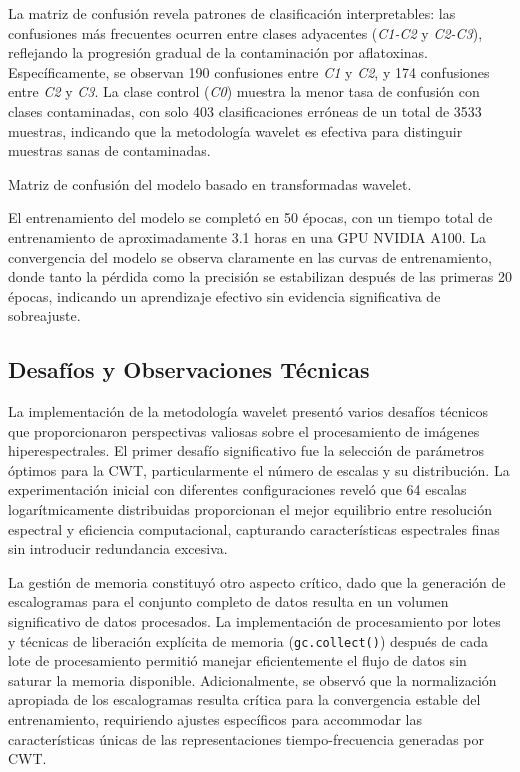 \vspace{5mm}

La matriz de confusión revela patrones de clasificación interpretables: las confusiones más frecuentes ocurren entre clases adyacentes (\emph{C1-C2} y \emph{C2-C3}), reflejando la progresión gradual de la contaminación por aflatoxinas. Específicamente, se observan 190 confusiones entre \emph{C1} y \emph{C2}, y 174 confusiones entre \emph{C2} y \emph{C3}. La clase control (\emph{C0}) muestra la menor tasa de confusión con clases contaminadas, con solo 403 clasificaciones erróneas de un total de 3533 muestras, indicando que la metodología wavelet es efectiva para distinguir muestras sanas de contaminadas.

\begin{table}[ht]
\centering
\caption{Matriz de confusión del modelo basado en transformadas wavelet.}
\label{tab:wavelet_confusion_matrix}
\end{table}

\vspace{5mm}

El entrenamiento del modelo se completó en 50 épocas, con un tiempo total de entrenamiento de aproximadamente 3.1 horas en una GPU NVIDIA A100. La convergencia del modelo se observa claramente en las curvas de entrenamiento, donde tanto la pérdida como la precisión se estabilizan después de las primeras 20 épocas, indicando un aprendizaje efectivo sin evidencia significativa de sobreajuste.

\subsection{Desafíos y Observaciones Técnicas}

La implementación de la metodología wavelet presentó varios desafíos técnicos que proporcionaron perspectivas valiosas sobre el procesamiento de imágenes hiperespectrales. El primer desafío significativo fue la selección de parámetros óptimos para la CWT, particularmente el número de escalas y su distribución. La experimentación inicial con diferentes configuraciones reveló que 64 escalas logarítmicamente distribuidas proporcionan el mejor equilibrio entre resolución espectral y eficiencia computacional, capturando características espectrales finas sin introducir redundancia excesiva.

\vspace{5mm}

La gestión de memoria constituyó otro aspecto crítico, dado que la generación de escalogramas para el conjunto completo de datos resulta en un volumen significativo de datos procesados. La implementación de procesamiento por lotes y técnicas de liberación explícita de memoria (\texttt{gc.collect()}) después de cada lote de procesamiento permitió manejar eficientemente el flujo de datos sin saturar la memoria disponible. Adicionalmente, se observó que la normalización apropiada de los escalogramas resulta crítica para la convergencia estable del entrenamiento, requiriendo ajustes específicos para accommodar las características únicas de las representaciones tiempo-frecuencia generadas por CWT.

